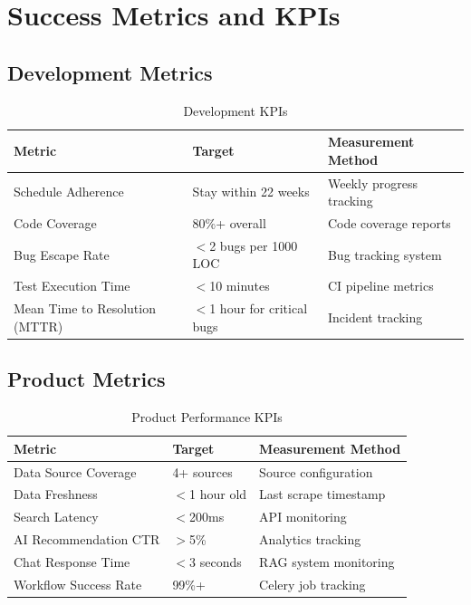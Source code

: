 \documentclass[12pt,oneside]{report}
\begin{document}
\chapter{Success Metrics and KPIs}

\section{Development Metrics}

\begin{table}[h]
\centering
\caption{Development KPIs}
\begin{tabular}{|p{3.5cm}|p{2.5cm}|p{3cm}|}
\hline
\rowcolor{lightblue}
\textbf{Metric} & \textbf{Target} & \textbf{Measurement Method} \\
\hline
Schedule Adherence & Stay within 22 weeks & Weekly progress tracking \\
\hline
Code Coverage & 80\%+ overall & Code coverage reports \\
\hline
Bug Escape Rate & $<$2 bugs per 1000 LOC & Bug tracking system \\
\hline
Test Execution Time & $<$10 minutes & CI pipeline metrics \\
\hline
Mean Time to Resolution (MTTR) & $<$1 hour for critical bugs & Incident tracking \\
\hline
\end{tabular}
\end{table}

\section{Product Metrics}

\begin{table}[h]
\centering
\caption{Product Performance KPIs}
\begin{tabular}{|p{3.5cm}|p{2.5cm}|p{3cm}|}
\hline
\rowcolor{lightblue}
\textbf{Metric} & \textbf{Target} & \textbf{Measurement Method} \\
\hline
Data Source Coverage & 4+ sources & Source configuration \\
\hline
Data Freshness & $<$1 hour old & Last scrape timestamp \\
\hline
Search Latency & $<$200ms & API monitoring \\
\hline
AI Recommendation CTR & $>$5\% & Analytics tracking \\
\hline
Chat Response Time & $<$3 seconds & RAG system monitoring \\
\hline
Workflow Success Rate & 99\%+ & Celery job tracking \\
\hline
\end{tabular}
\end{table}
\end{document}
